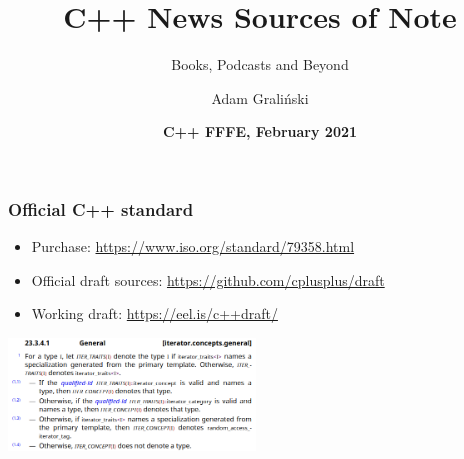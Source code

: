 \documentclass{beamer}
\title[LTN01 :: NewsSources]{C++ News Sources of Note}
\subtitle{Books, Podcasts and Beyond}
\author{Adam Graliński}
\date[FFFE\_21]{\textbf{C++ {\color{red}F}{\color{blue}F}{\color{green}F}{\color{yellow}E}, February 2021}}
\begin{document}
{
\begin{frame}

\titlepage{}
\end{frame}
}

\begin{frame}
\frametitle{Official C++ standard}
\begin{itemize}
  \item Purchase: \url{https://www.iso.org/standard/79358.html}
  \item Official draft sources: \url{https://github.com/cplusplus/draft}
  \item Working draft: \url{https://eel.is/c++draft/}
\end{itemize}
\begin{center}
  \includegraphics[height=3cm]{pics/std_23_iterators.png}
\end{center}
\end{frame}
\end{document}
